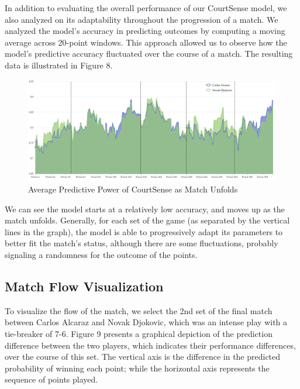 \documentclass[12pt]{article}  %
\begin{document}
In addition to evaluating the overall performance of our CourtSense model, we also analyzed on its adaptability throughout the progression of a match. We analyzed the model's accuracy in predicting outcomes by computing a moving average across 20-point windows. This approach allowed us to observe how the model's predictive accuracy fluctuated over the course of a match. The resulting data is illustrated in Figure 8. 

\begin{figure}[htbp]  %
	\centering  %
	\includegraphics[width=.8\textwidth]{moving-average.png} %
	\caption{Average Predictive Power of CourtSense as Match Unfolds} %
\end{figure}
\vspace{-0.5cm}

We can see the model starts at a relatively low accuracy, and moves up as the match unfolds. Generally, for each set of the game (as separated by the vertical lines in the graph), the model is able to progressively adapt its parameters to better fit the match's status, although there are some fluctuations, probably signaling a randomness for the outcome of the points.

\subsection{Match Flow Visualization}
To visualize the flow of the match, we select the 2nd set of the final match between Carlos Alcaraz and Novak Djokovic, which was an intense play with a tie-breaker of 7-6. Figure 9 presents a graphical depiction of the prediction difference between the two players, which indicates their performance differences, over the course of this set. The vertical axis is the difference in the predicted probability of winning each point; while the horizontal axis represents the sequence of points played. 
\end{document}
